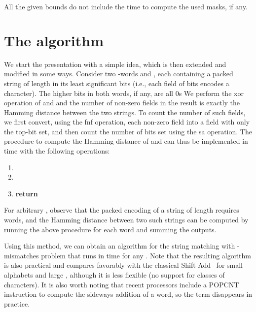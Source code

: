 \documentclass{llncs}
\def \bxor{\textsf{xor}\xspace}
\newcommand{\fword}[1]{-word}
\begin{document}
All the given bounds do not include the time to compute the used masks, if any.

\section{The algorithm}
\label{sec:the_algorithm}


\noindent
We start the presentation with a simple idea, which is then extended
and modified in some ways. Consider two
\fword{\log\sigma}s  and , each containing a
packed string of length  in its  least significant
bits (i.e., each field of  bits encodes a character). The
higher bits in both words, if any, are all 0s
We perform the \bxor operation of  and  and the
number of non-zero fields in the result is exactly the Hamming
distance between the two strings. To count the number of such fields,
we first convert, using the \textsf{fnf} operation, each non-zero
field into a field with only the top-bit set, and then count the number
of bits set using the \textsf{sa} operation.
The procedure to compute the Hamming distance of  and
 can thus be implemented in time  with the
following operations:
\begin{enumerate}
\item 
\item 
\item \textbf{return} 
\end{enumerate}
For arbitrary , observe that the packed encoding of a string of
length  requires  words, and the Hamming
distance between two such strings can be computed by running the above
procedure for each word and summing the outputs.

Using this method, we can obtain an algorithm for the string matching
with -mismatches problem that runs in  time for any . Note that the resulting algorithm
is also practical and compares favorably with the classical Shift-Add~\cite{DBLP:journals/cacm/Baeza-YatesG92}
for small alphabets
and large , although it is less flexible (no support for classes of
characters). It is also worth noting that recent processors include a
\textsc{POPCNT} instruction to compute the sideways addition of a
word, so the  term disappears in practice.
\end{document}
